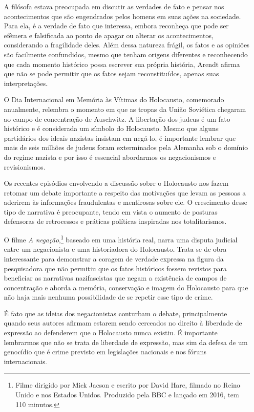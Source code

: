 A filósofa estava preocupada em discutir as verdades de fato e pensar
nos acontecimentos que são engendrados pelos homens em suas ações na
sociedade. Para ela, é a verdade de fato que interessa, embora reconheça
que pode ser efêmera e falsificada ao ponto de apagar ou alterar os
acontecimentos, considerando a fragilidade deles. Além dessa natureza
frágil, os fatos e as opiniões são facilmente confundidos, mesmo que
tenham origens diferentes e reconhecendo que cada momento histórico
possa escrever sua própria história, Arendt afirma que não se pode
permitir que os fatos sejam reconstituídos, apenas suas interpretações.

O Dia Internacional em Memória às Vítimas do Holocausto, comemorado
anualmente, relembra o momento em que as tropas da União Soviética
chegaram ao campo de concentração de Auschwitz. A libertação dos judeus
é um fato histórico e é considerada um símbolo do Holocausto. Mesmo que alguns 
partidários dos ideais nazistas insistam em negá-lo, é
importante lembrar que mais de seis milhões de judeus foram exterminados
pela Alemanha sob o domínio do regime nazista e por isso é essencial
abordarmos os negacionismos e revisionismos.

Os recentes episódios envolvendo a discussão sobre o Holocausto nos
fazem retomar um debate importante a respeito das motivações que levam
as pessoas a aderirem às informações fraudulentas e mentirosas sobre
ele. O crescimento desse tipo de narrativa é preocupante, tendo em vista
o aumento de posturas defensoras de retrocessos e práticas políticas
inspiradas nos totalitarismos.

O filme \textit{A negação},\footnote{Filme dirigido por Mick Jacson e
  escrito por David Hare, filmado no Reino Unido e nos Estados Unidos. Produzido pela BBC e lançado em 2016, tem 110 minutos.} baseado em uma história real, narra uma
disputa judicial entre um negacionista e uma historiadora do Holocausto.
Trata-se de obra interessante para demonstrar a coragem de verdade
expressa na figura da pesquisadora que não permitiu que os fatos
históricos fossem revistos para beneficiar as narrativas nazifascistas
que negam a existência de campos de concentração e aborda a memória,
conservação e imagem do Holocausto para que não haja mais nenhuma
possibilidade de se repetir esse tipo de crime.

É fato que as ideias dos negacionistas conturbam o debate,
principalmente quando seus autores afirmam estarem sendo cerceados no
direito à liberdade de expressão ao defenderem que o Holocausto nunca
existiu. É importante lembrarmos que não se trata de liberdade de
expressão, mas sim da defesa de um genocídio que é crime previsto em
legislações nacionais e nos fóruns internacionais.

